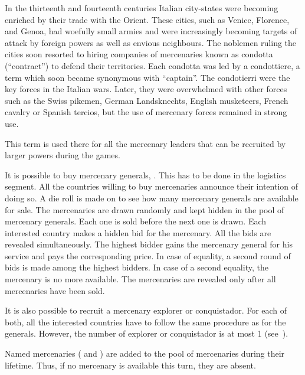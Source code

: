 \begin{histoire}[Condottieri]
  In the thirteenth and fourteenth centuries Italian city-states were becoming
  enriched by their trade with the Orient. These cities, such as Venice,
  Florence, and Genoa, had woefully small armies and were increasingly
  becoming targets of attack by foreign powers as well as envious
  neighbours. The noblemen ruling the cities soon resorted to hiring companies
  of mercenaries known as condotta (``contract'') to defend their
  territories. Each condotta was led by a condottiere, a term which soon
  became synonymous with ``captain''. The condotierri were the key forces in
  the Italian wars. Later, they were overwhelmed with other forces such as the
  Swiss pikemen, German Landsknechts, English musketeers, French cavalry or
  Spanish tercios, but the use of mercenary forces remained in strong use.

  This term is used there for all the mercenary leaders that can be recruited
  by larger powers during the games.
\end{histoire}
\aparag It is possible to buy mercenary generals, . This has to be done in the
logistics segment.
\bparag All the countries willing to buy mercenaries announce their intention
of doing so.
\bparag A die roll is made on  to see how many
mercenary generals are available for sale.
\bparag The mercenaries are drawn randomly and kept hidden in the pool of
mercenary generals. Each one is sold before the next one is drawn.
\bparag Each interested country makes a hidden bid for the mercenary. All the
bids are revealed simultaneously.
\bparag The highest bidder gains the mercenary general for his service and
pays the corresponding price. In case of equality, a second round of bids is
made among the highest bidders. In case of a second equality, the mercenary is
no more available.
\bparag The mercenaries are revealed only after all mercenaries have been
sold.

\aparag It is also possible to recruit a mercenary explorer or
conquistador. For each of both, all the interested countries have to follow
the same procedure as for the generals.
\bparag However, the number of explorer or conquistador is at most 1
(see~).  

\aparag[] [BLP] Named mercenaries ( and ) are
added to the pool of mercenaries during their lifetime. Thus, if no mercenary
\LeaderE is available this turn, they are absent.

